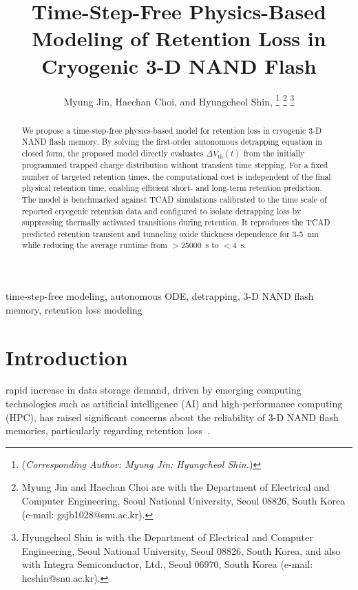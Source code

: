 \documentclass[journal,twoside,web]{ieeecolor}
\begin{document}
\linenumbers
\IEEEaftertitletext{\vspace{-1cm}} %
\title{Time-Step-Free Physics-Based Modeling of Retention Loss in Cryogenic 3-D NAND Flash}\author{Myung Jin, Haechan Choi, and Hyungcheol Shin, 
\thanks{(\textit{Corresponding Author: Myung Jin; Hyungcheol Shin.}) }
\thanks{Myung Jin and Haechan Choi are with the Department of Electrical and Computer Engineering, Seoul National University, Seoul 08826, South Korea (e-mail: gsjb1028@snu.ac.kr).}
\thanks{Hyungcheol Shin is with the Department of Electrical and Computer Engineering, Seoul National University, Seoul 08826, South Korea, and also with Integra Semiconductor, Ltd., Seoul 06970, South Korea (e-mail: hcshin@snu.ac.kr).}}

\maketitle
\begin{abstract}
We propose a time-step-free physics-based model for retention loss in cryogenic 3-D NAND flash memory.
By solving the first-order autonomous detrapping equation in closed form, the proposed model directly evaluates $\Delta V_\text{th}(t)$ from the initially programmed trapped charge distribution without transient time stepping.
For a fixed number of targeted retention times, the computational cost is independent of the final physical retention time, enabling efficient short- and long-term retention prediction.
The model is benchmarked against TCAD simulations calibrated to the time scale of reported cryogenic retention data and configured to isolate detrapping loss by suppressing thermally activated transitions during retention.
It reproduces the TCAD predicted retention transient and tunneling oxide thickness dependence for 3-5~nm while reducing the average runtime from $>$25000~s to $<$4~s.
\end{abstract}

\begin{IEEEkeywords}
time-step-free modeling, autonomous ODE, detrapping, 3-D NAND flash memory, retention loss modeling
\end{IEEEkeywords}

\section{Introduction}
\label{sec:introduction}
 rapid increase in data storage demand, driven by emerging computing technologies such as artificial intelligence (AI) and high-performance computing (HPC), has raised significant concerns about the reliability of 3-D NAND flash memories, particularly regarding retention loss~\cite{agoda}.
\end{document}
